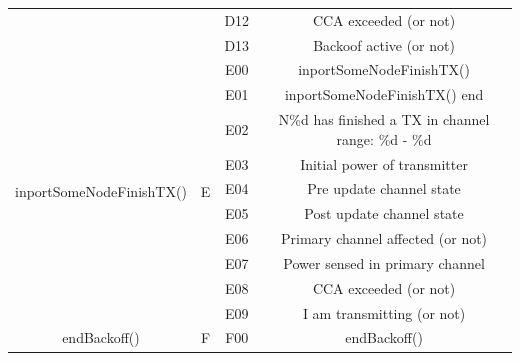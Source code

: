 \documentclass[a4paper]{article}
\begin{document}
\begin{table}[]
\begin{tabular}{|c|c|c|c|}
		                                           &                     & D12               & CCA exceeded (or not)                                   \\ \cline{3-4} 
		                                           &                     & D13               & Backoof active (or not)                                 \\ \hline
		\multirow{10}{*}{inportSomeNodeFinishTX()} & \multirow{10}{*}{E} & E00               & inportSomeNodeFinishTX()                                \\ \cline{3-4} 
		                                           &                     & E01               & inportSomeNodeFinishTX() end                            \\ \cline{3-4} 
		                                           &                     & E02               & N\%d has finished a TX in channel range: \%d - \%d      \\ \cline{3-4} 
		                                           &                     & E03               & Initial power of transmitter                            \\ \cline{3-4} 
		                                           &                     & E04               & Pre update channel state                                \\ \cline{3-4} 
		                                           &                     & E05               & Post update channel state                               \\ \cline{3-4} 
		                                           &                     & E06               & Primary channel affected (or not)                       \\ \cline{3-4} 
		                                           &                     & E07               & Power sensed in primary channel                         \\ \cline{3-4} 
		                                           &                     & E08               & CCA exceeded (or not)                                   \\ \cline{3-4} 
		                                           &                     & E09               & I am transmitting (or not)                              \\ \hline
		\multirow{6}{*}{endBackoff()}              & \multirow{6}{*}{F}  & F00               & endBackoff()                                            \\ \cline{3-4} 

\end{tabular}
\end{table}
\end{document}
